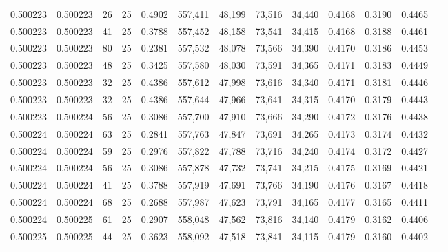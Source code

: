\begin{tabular}{rrrrrrrrrrrrr}
0.500223 & 0.500223 &    26 &  25 &                                     0.4902 & 557,411 &  48,199 &  73,516 &  34,440 & 0.4168 & 0.3190 & 0.4465 \\
0.500223 & 0.500223 &    41 &  25 &                                     0.3788 & 557,452 &  48,158 &  73,541 &  34,415 & 0.4168 & 0.3188 & 0.4461 \\
0.500223 & 0.500223 &    80 &  25 &                                     0.2381 & 557,532 &  48,078 &  73,566 &  34,390 & 0.4170 & 0.3186 & 0.4453 \\
0.500223 & 0.500223 &    48 &  25 &                                     0.3425 & 557,580 &  48,030 &  73,591 &  34,365 & 0.4171 & 0.3183 & 0.4449 \\
0.500223 & 0.500223 &    32 &  25 &                                     0.4386 & 557,612 &  47,998 &  73,616 &  34,340 & 0.4171 & 0.3181 & 0.4446 \\
0.500223 & 0.500223 &    32 &  25 &                                     0.4386 & 557,644 &  47,966 &  73,641 &  34,315 & 0.4170 & 0.3179 & 0.4443 \\
0.500223 & 0.500224 &    56 &  25 &                                     0.3086 & 557,700 &  47,910 &  73,666 &  34,290 & 0.4172 & 0.3176 & 0.4438 \\
0.500224 & 0.500224 &    63 &  25 &                                     0.2841 & 557,763 &  47,847 &  73,691 &  34,265 & 0.4173 & 0.3174 & 0.4432 \\
0.500224 & 0.500224 &    59 &  25 &                                     0.2976 & 557,822 &  47,788 &  73,716 &  34,240 & 0.4174 & 0.3172 & 0.4427 \\
0.500224 & 0.500224 &    56 &  25 &                                     0.3086 & 557,878 &  47,732 &  73,741 &  34,215 & 0.4175 & 0.3169 & 0.4421 \\
0.500224 & 0.500224 &    41 &  25 &                                     0.3788 & 557,919 &  47,691 &  73,766 &  34,190 & 0.4176 & 0.3167 & 0.4418 \\
0.500224 & 0.500224 &    68 &  25 &                                     0.2688 & 557,987 &  47,623 &  73,791 &  34,165 & 0.4177 & 0.3165 & 0.4411 \\
0.500224 & 0.500225 &    61 &  25 &                                     0.2907 & 558,048 &  47,562 &  73,816 &  34,140 & 0.4179 & 0.3162 & 0.4406 \\
0.500225 & 0.500225 &    44 &  25 &                                     0.3623 & 558,092 &  47,518 &  73,841 &  34,115 & 0.4179 & 0.3160 & 0.4402 \\

\end{tabular}
